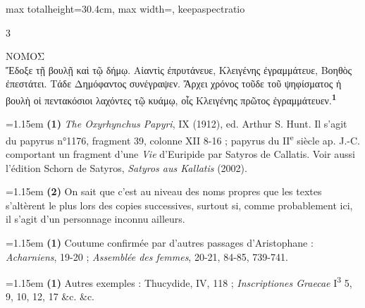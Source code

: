 \documentclass[11pt,twoside]{book}
\newcommand{\currHeadLE}{}
\newcommand{\currHeadRE}{}
\newcommand{\currHeadLO}{}
\newcommand{\currHeadRO}{}
\newcommand{\italique}[1]{\textit{#1}}
\newcommand{\citComm}[1]{\begin{quoting}[vskip=0.4pt,leftmargin=0.7em,rightmargin=0.2em]#1\end{quoting}}
\newcommand{\nieme}[1]{#1\textsuperscript{e}}
\newcommand{\expo}[1]{\textsuperscript{#1}}
\newcommand{\R}{\textbf{R}}
\newcommand{\marqueur}[1]{\textsuperscript{\color{rubricRed}\textbf{#1}}}
\begin{document}
\begin{adjustbox}{max totalheight=30.4cm, max width=\textwidth, keepaspectratio}
\begin{minipage}{\textwidth}
{\begin{multicols}{3}
\citComm{ΝΟΜΟΣ\\
Ἔδοξε τῇ βουλῇ καὶ τῷ δήμῳ. Αἰαντὶς ἐπρυτάνευε, Κλειγένης ἐγραμμάτευε, Βοηθὸς ἐπεστάτει. Τάδε Δημόφαντος συνέγραψεν. Ἄρχει χρόνος τοῦδε τοῦ ψηφίσματος ἡ βουλὴ οἱ πεντακόσιοι λαχόντες τῷ κυάμῳ, οἷς Κλειγένης πρῶτος ἐγραμμάτευεν.\marqueur{1}}
\par\vspace{1.5pt}
\par\vspace{1.2pt}\par\nopagebreak\vspace{1pt}\noindent\hangindent=1.15em {\color{sepiaNote}\textbf{(1)}} \italique{The Oxyrhynchus Papyri}, IX (1912), ed. Arthur S. Hunt. Il s'agit du papyrus n°1176, fragment 39, colonne XII 8-16 ; papyrus du \nieme{II} siècle ap. J.-C. comportant un fragment d'une \italique{Vie} d'Euripide par Satyros de Callatis. Voir aussi l'édition Schorn de Satyros, \italique{Satyros aus Kallatis} (2002).
\par\vspace{1.5pt}
\noindent\hangindent=1.15em {\color{sepiaNote}\textbf{(2)}} On sait que c'est au niveau des noms propres que les textes s'altèrent le plus lors des copies successives, surtout si, comme probablement ici, il s'agit d'un personnage inconnu ailleurs.
\par\vspace{1.5pt}
\noindent\hangindent=1.15em {\color{sepiaNote}\textbf{(1)}} Coutume confirmée par d'autres passages d'Aristophane : \italique{Acharniens}, 19-20 ; \italique{Assemblée des femmes}, 20-21, 84-85, 739-741.
\par\vspace{1.5pt}
\noindent\hangindent=1.15em {\color{sepiaNote}\textbf{(1)}} Autres exemples : Thucydide, IV, 118 ; \italique{Inscriptiones Graecae} I\expo{3} 5, 9, 10, 12, 17 \&c. \&c.
\par\end{multicols}}
\end{minipage}\end{adjustbox}
\clearpage\ifodd\value{page}\hbox{}\newpage\fi
\renewcommand{\currHeadLE}{ΑΡΙΣΤΟΦΑΝΟΥΣ ΘΕΣΜΟΦΟΡΙΑΖΟΥΣΑΙ · CODEX RAVENNAS 429 (\R)}
\renewcommand{\currHeadRE}{Folio f. 167r (Classense 169r) · vv. 380–422}
\renewcommand{\currHeadLO}{FAC-SIMILÉ DU CODEX RAVENNAS 429 (\R) · f. 167r (Classense 169r)}
\renewcommand{\currHeadRO}{vv. 380–422 · Planche recadrée sur la zone écrite et harmonisée}
\end{document}
